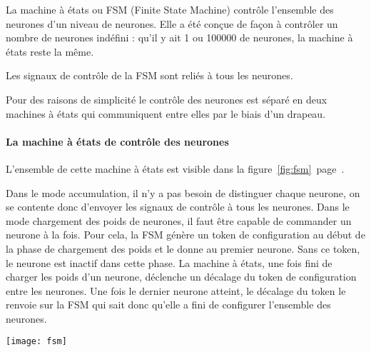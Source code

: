 La machine à états ou FSM (Finite State Machine) contrôle l'ensemble des neurones
d'un niveau de neurones.
Elle a été conçue de façon à contrôler un nombre de neurones indéfini : qu'il y
ait 1 ou 100000 de neurones, la machine à états reste la même.

Les signaux de contrôle de la FSM sont reliés à tous les neurones.

Pour des raisons de simplicité le contrôle des neurones est séparé en deux
machines à états qui communiquent entre elles par le biais d'un drapeau.

\paragraph{La machine à états de contrôle des neurones}

L'ensemble de cette machine à états est visible dans la
figure~\ref{fig:fsm}~page~\pageref{fig:fsm}.

Dans le mode accumulation,
il n'y a pas besoin de distinguer chaque neurone, on se contente donc d'envoyer
les signaux de contrôle à tous les neurones.
Dans le mode chargement des poids de neurones, il faut être capable de commander
un neurone à la fois. Pour cela, la FSM génère un token de configuration au début
de la phase de chargement des poids et le donne au premier neurone. Sans ce token,
le neurone est inactif dans cette phase. La machine à états, une fois fini de
charger les poids d'un neurone, déclenche un décalage du token de configuration
entre les neurones. Une fois le dernier neurone atteint, le décalage du token
le renvoie sur la FSM qui sait donc qu'elle a fini de configurer l'ensemble des
neurones.

\begin{sidewaysfigure}
	\texttt{[image: fsm]}
	\caption{Machine à états de contrôle des neurones}
	\label{fig:fsm}
\end{sidewaysfigure}

